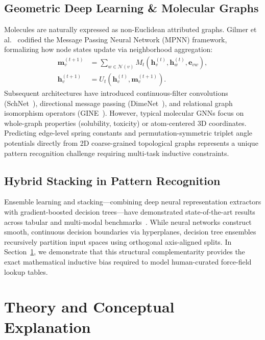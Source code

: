 \documentclass[11pt,a4paper]{article}
\begin{document}
\subsection{Geometric Deep Learning \& Molecular Graphs}
Molecules are naturally expressed as non-Euclidean attributed graphs. Gilmer et al.~\cite{gilmer2017neural} codified the Message Passing Neural Network (MPNN) framework, formalizing how node states update via neighborhood aggregation:
\begin{align}
\mathbf{m}_v^{(t+1)} &= \sum_{w \in \mathcal{N}(v)} M_t(\mathbf{h}_v^{(t)}, \mathbf{h}_w^{(t)}, \mathbf{e}_{vw}), \\
\mathbf{h}_v^{(t+1)} &= U_t(\mathbf{h}_v^{(t)}, \mathbf{m}_v^{(t+1)}).
\end{align}
Subsequent architectures have introduced continuous-filter convolutions (SchNet~\cite{schutt2017schnet}), directional message passing (DimeNet~\cite{gasteiger2020directional}), and relational graph isomorphism operators (GINE~\cite{hu2020strategies}). However, typical molecular GNNs focus on whole-graph properties (solubility, toxicity) or atom-centered 3D coordinates. Predicting edge-level spring constants and permutation-symmetric triplet angle potentials directly from 2D coarse-grained topological graphs represents a unique pattern recognition challenge requiring multi-task inductive constraints.

\subsection{Hybrid Stacking in Pattern Recognition}
Ensemble learning and stacking---combining deep neural representation extractors with gradient-boosted decision trees---have demonstrated state-of-the-art results across tabular and multi-modal benchmarks~\cite{chen2016xgboost}. While neural networks construct smooth, continuous decision boundaries via hyperplanes, decision tree ensembles recursively partition input spaces using orthogonal axis-aligned splits. In Section~\ref{sec:theory}, we demonstrate that this structural complementarity provides the exact mathematical inductive bias required to model human-curated force-field lookup tables.

\section{Theory and Conceptual Explanation}
\label{sec:theory}
\end{document}
